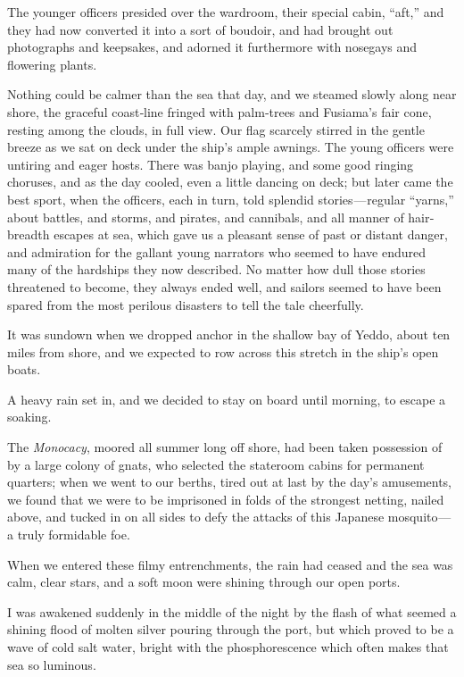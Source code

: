 \documentclass[12pt]{book}
\begin{document}
The younger officers presided over the wardroom, their special cabin, “aft,” and
they had now converted it into a sort of boudoir, and had brought out photographs
and keepsakes, and adorned it furthermore with nosegays and flowering plants.

Nothing could be calmer than the sea that day, and we steamed slowly along
near shore, the graceful coast‐line fringed with palm‐trees and Fusiama’s fair
cone, resting among the clouds, in full view. Our flag scarcely stirred in the gentle
breeze as we sat on deck under the ship’s ample awnings. The young officers
were untiring and eager hosts. There was banjo playing, and some good ringing
choruses, and as the day cooled, even a little dancing on deck; but later came
the best sport, when the officers, each in turn, told splendid stories — regular
“yarns,” about battles, and storms, and pirates, and cannibals, and all manner of
hair‐breadth escapes at sea, which gave us a pleasant sense of past or distant
danger, and admiration for the gallant young narrators who seemed to have
endured many of the hardships they now described. No matter how dull those
stories threatened to become, they always ended well, and sailors seemed to have
been spared from the most perilous disasters to tell the tale cheerfully.

It was sundown when we dropped anchor in the shallow bay of Yeddo, about
ten miles from shore, and we expected to row across this stretch in the ship’s
open boats.

A heavy rain set in, and we decided to stay on board until morning, to escape
a soaking.

The {\it Monocacy}, moored all summer long off shore, had been taken possession
of by a large colony of gnats, who selected the stateroom cabins for permanent
quarters; when we went to our berths, tired out at last by the day’s amusements,
we found that we were to be imprisoned in folds of the strongest netting, nailed
above, and tucked in on all sides to defy the attacks of this Japanese mosquito — a
truly formidable foe.

When we entered these filmy entrenchments, the rain had ceased and the sea
was calm, clear stars, and a soft moon were shining through our open ports.

I was awakened suddenly in the middle of the night by the flash of what
seemed a shining flood of molten silver pouring through the port, but which
proved to be a wave of cold salt water, bright with the phosphorescence which
often makes that sea so luminous.
\end{document}

